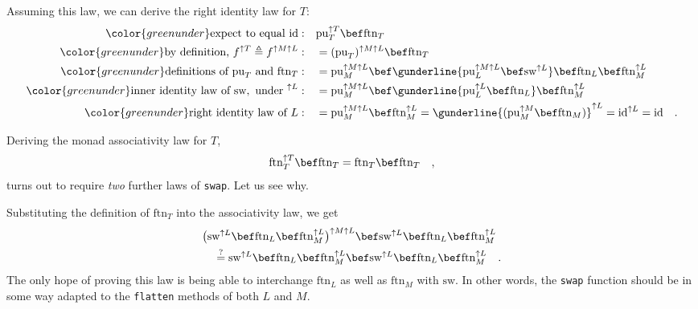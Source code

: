 Assuming this law, we can derive the right identity law for $T$:
\begin{align*}
{\color{greenunder}\text{expect to equal }\text{id}:}\quad & \text{pu}_{T}^{\uparrow T}\bef\text{ftn}_{T}\\
{\color{greenunder}\text{by definition, }f^{\uparrow T}\triangleq f^{\uparrow M\uparrow L}:}\quad & =(\text{pu}_{T})^{\uparrow M\uparrow L}\bef\text{ftn}_{T}\\
{\color{greenunder}\text{definitions of }\text{pu}_{T}\text{ and }\text{ftn}_{T}:}\quad & =\text{pu}_{M}^{\uparrow M\uparrow L}\bef\gunderline{\text{pu}_{L}^{\uparrow M\uparrow L}\bef\text{sw}^{\uparrow L}}\bef\text{ftn}_{L}\bef\text{ftn}_{M}^{\uparrow L}\\
{\color{greenunder}\text{inner identity law of }\text{sw},\text{ under }^{\uparrow L}:}\quad & =\text{pu}_{M}^{\uparrow M\uparrow L}\bef\gunderline{\text{pu}_{L}^{\uparrow L}\bef\text{ftn}_{L}}\bef\text{ftn}_{M}^{\uparrow L}\\
{\color{greenunder}\text{right identity law of }L:}\quad & =\text{pu}_{M}^{\uparrow M\uparrow L}\bef\text{ftn}_{M}^{\uparrow L}=\gunderline{(\text{pu}_{M}^{\uparrow M}\bef\text{ftn}_{M})}^{\uparrow L}=\text{id}^{\uparrow L}=\text{id}\quad.
\end{align*}

Deriving the monad associativity law for $T$,
\[
\text{ftn}_{T}^{\uparrow T}\bef\text{ftn}_{T}=\text{ftn}_{T}\bef\text{ftn}_{T}\quad,
\]
turns out to require \emph{two} further laws of \lstinline!swap!.
Let us see why.

Substituting the definition of $\text{ftn}_{T}$ into the associativity
law, we get
\begin{align}
 & \big(\text{sw}^{\uparrow L}\bef\text{ftn}_{L}\bef\text{ftn}_{M}^{\uparrow L}\big)^{\uparrow M\uparrow L}\bef\text{sw}^{\uparrow L}\bef\text{ftn}_{L}\bef\text{ftn}_{M}^{\uparrow L}\nonumber \\
 & \quad\overset{?}{=}\text{sw}^{\uparrow L}\bef\text{ftn}_{L}\bef\text{ftn}_{M}^{\uparrow L}\bef\text{sw}^{\uparrow L}\bef\text{ftn}_{L}\bef\text{ftn}_{M}^{\uparrow L}\quad.\label{eq:t-assoc-law-expanded}
\end{align}
The only hope of proving this law is being able to interchange $\text{ftn}_{L}$
as well as $\text{ftn}_{M}$ with $\text{sw}$. In other words, the
\texttt{}\lstinline!swap! function should be in some way adapted
to the \texttt{}\lstinline!flatten! methods of both $L$ and $M$.

